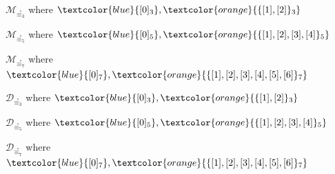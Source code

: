\documentclass[10pt,serif, professionalfont]{beamer}
\begin{document}
\begin{frame}{$\mathcal{M}_{\stackrel{\circ}{\equiv_{3}}}$ where 
    $\textcolor{blue}{[0]_{3}},\textcolor{orange}{\lbrace [1],[2] \rbrace_{3}}$}

    
\end{frame}
\begin{frame}{$\mathcal{M}_{\stackrel{\circ}{\equiv_{5}}}$ where 
    $\textcolor{blue}{[0]_{5}},\textcolor{orange}{\lbrace [1],[2],[3],[4] \rbrace_{5}}$}

    
\end{frame}
\begin{frame}{$\mathcal{M}_{\stackrel{\circ}{\equiv_{7}}}$ where 
    $\textcolor{blue}{[0]_{7}},\textcolor{orange}{\lbrace [1],[2],[3],[4],[5],[6] \rbrace_{7}}$}

    
\end{frame}



\begin{frame}{$\mathcal{D}_{\stackrel{\circ}{\equiv_{3}}}$ where 
    $\textcolor{blue}{[0]_{3}},\textcolor{orange}{\lbrace [1],[2] \rbrace_{3}}$}

    
\end{frame}
\begin{frame}{$\mathcal{D}_{\stackrel{\circ}{\equiv_{5}}}$ where 
    $\textcolor{blue}{[0]_{5}},\textcolor{orange}{\lbrace [1],[2],[3],[4] \rbrace_{5}}$}

    
\end{frame}
\begin{frame}{$\mathcal{D}_{\stackrel{\circ}{\equiv_{7}}}$ where 
    $\textcolor{blue}{[0]_{7}},\textcolor{orange}{\lbrace [1],[2],[3],[4],[5],[6] \rbrace_{7}}$}

    
\end{frame}
\end{document}
